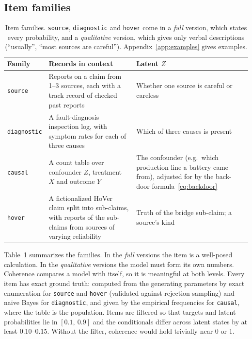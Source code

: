 \documentclass[11pt]{article}
\begin{document}
\subsection{Item families}
\label{sec:data}

\begin{table}[t]
\centering\small
\begin{tabular}{@{}l>{\raggedright}p{5.6cm}>{\raggedright\arraybackslash}p{5.4cm}@{}}
\toprule
Family & Records in context & Latent $Z$ \\
\midrule
\texttt{source} & Reports on a claim from 1--3 sources, each with a track record of checked past reports & Whether one source is careful or careless \\
\texttt{diagnostic} & A fault-diagnosis inspection log, with symptom rates for each of three causes & Which of three causes is present \\
\texttt{causal} & A count table over confounder $Z$, treatment $X$ and outcome $Y$ & The confounder (e.g.\ which production line a battery came from), adjusted for by the back-door formula~\eqref{eq:backdoor} \\
\texttt{hover} & A fictionalized HoVer claim split into sub-claims, with reports of the sub-claims from sources of varying reliability & Truth of the bridge sub-claim; a source's kind \\
\bottomrule
\end{tabular}
\caption{Item families. \texttt{source}, \texttt{diagnostic} and \texttt{hover} come in a \emph{full} version, which states every probability, and a \emph{qualitative} version, which gives only verbal descriptions (``usually'', ``most sources are careful''). Appendix~\ref{app:examples} gives examples.}
\label{tab:families}
\end{table}

Table~\ref{tab:families} summarizes the families. In the \emph{full} versions the item is a well-posed calculation. In the \emph{qualitative} versions the model must form its own numbers. Coherence compares a model with itself, so it is meaningful at both levels. Every item has exact ground truth: computed from the generating parameters by exact enumeration for \texttt{source} and \texttt{hover} (validated against rejection sampling) and naive Bayes for \texttt{diagnostic}, and given by the empirical frequencies for \texttt{causal}, where the table is the population. Items are filtered so that targets and latent probabilities lie in $[0.1,\ 0.9]$ and the conditionals differ across latent states by at least 0.10--0.15. Without the filter, coherence would hold trivially near 0 or 1.
\end{document}
